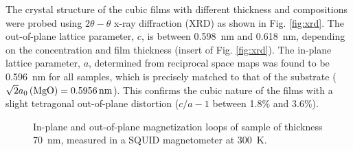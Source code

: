 \documentclass[reprint,aip,apl,floatfix,linenumbers,superscriptaddress]{revtex4-1}
\begin{document}
The crystal structure of the cubic  films with different thickness and compositions were probed using $2\theta-\theta$ x-ray diffraction (XRD) as shown in Fig. \ref{fig:xrd}. The out-of-plane lattice parameter, $c$, is between \SI{0.598}{\nano\metre} and \SI{0.618}{\nano\metre}, depending on the  concentration and film thickness (insert of Fig. \ref{fig:xrd}). The in-plane lattice parameter, $a$, determined from reciprocal space maps was found to be \SI{0.596}{\nano\metre} for all samples, which is precisely matched to that of the  substrate ($\sqrt{2} a_0\left(\ce{MgO} \right) = \SI{0.5956}{\nano\metre}$). This confirms the cubic nature of the  films with a slight tetragonal out-of-plane distortion ($c/a-1$ between \num{1.8}\% and \num{3.6}\%).
\begin{figure}
\caption{In-plane and out-of-plane magnetization loops of  sample of thickness \SI{70}{\nano\metre}, measured in a SQUID magnetometer at \SI{300}{\kelvin}.}
\label{fig:squid}
\end{figure}
\end{document}
